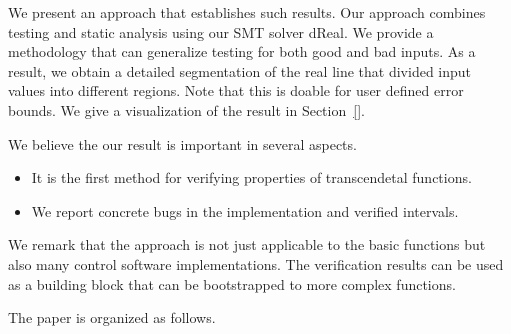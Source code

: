 We present an approach that establishes such results. Our approach combines testing and static analysis using our SMT solver dReal. We provide a methodology that can generalize testing for both good and bad inputs. As a result, we obtain a detailed segmentation of the real line that divided input values into different regions. Note that this is doable for user defined error bounds. We give a visualization of the result in Section~\ref{}. 

We believe the our result is important in several aspects. 
\begin{itemize}
\item It is the first method for verifying properties of transcendetal functions. 
\item We report concrete bugs in the implementation and verified intervals. 
\end{itemize}
We remark that the approach is not just applicable to the basic functions but also many control software implementations. The verification results can be used as a building block that can be bootstrapped to more complex functions. 

The paper is organized as follows. 










